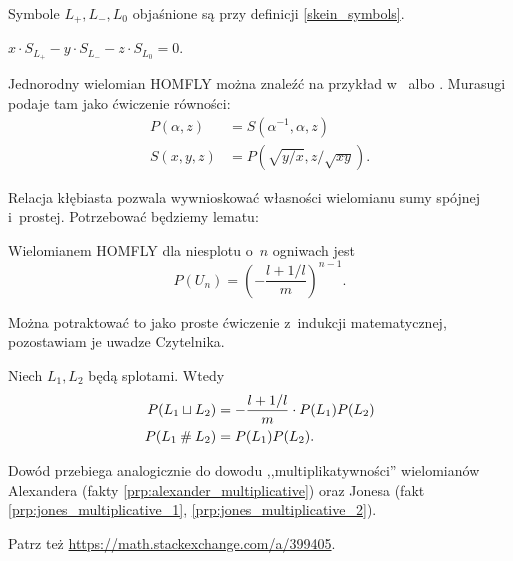 Symbole $L_+, L_-, L_0$ objaśnione są przy definicji \ref{skein_symbols}.

\begin{definition}
    $x \cdot S_{L_+} - y \cdot S_{L_-} - z \cdot S_{L_0} = 0$.
\end{definition}

Jednorodny wielomian HOMFLY można znaleźć na przykład w~\cite[s. 10]{millett1988} albo \cite[s. 231]{murasugi1996}.
Murasugi podaje tam jako ćwiczenie równości:
%
\begin{align}
    P(\alpha, z) & = S(\alpha^{-1}, \alpha, z) \\
    S(x, y, z) & = P(\sqrt{y/x}, z/\sqrt{xy}).
\end{align}

Relacja kłębiasta pozwala wywnioskować własności wielomianu sumy spójnej i~prostej.
Potrzebować będziemy lematu:

\begin{lemma}
\label{lem:homfly_unlinks}%
    Wielomianem HOMFLY dla niesplotu o~$n$ ogniwach jest
    \begin{equation}
        P(U_n) = \left(-\frac{l+1/l}{m}\right)^{n-1}.
    \end{equation}
\end{lemma}

Można potraktować to jako proste ćwiczenie z~indukcji matematycznej, pozostawiam je uwadze Czytelnika.

\begin{proposition}
    Niech $L_1, L_2$ będą splotami.
    Wtedy
    \begin{align}
        P(L_1 \sqcup L_2) & = - \frac{l + 1/l}{m} \cdot P(L_1) P(L_2) \\
        P(L_1 \mathbin{\#} L_2) & = P(L_1) P(L_2).
    \end{align}
\end{proposition}

Dowód przebiega analogicznie do dowodu ,,multiplikatywności'' wielomianów Alexandera (fakty \ref{prp:alexander_multiplicative}) oraz Jonesa (fakt \ref{prp:jones_multiplicative_1}, \ref{prp:jones_multiplicative_2}).

Patrz też \url{https://math.stackexchange.com/a/399405}.

